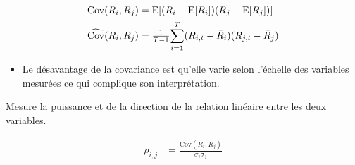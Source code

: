 \documentclass[10pt, french]{article}
\begin{document}
\begin{multicols*}{2}
\begin{definitionNOHFILL}[Covariance]
\begin{align*}
	\text{Cov}(R_{i}, R_{j})
	&=	\text{E}[(R_{i}	-	\text{E}[R_{i}])(R_{j}	-	\text{E}[R_{j}])]	\\
	\widehat{\text{Cov}}	(R_{i}, R_{j})
	&=	\tfrac{1}{T	-	1} \overset{T}{\underset{i	=	1}{\sum}} (R_{i, t}	-	\bar{R}_{i})(R_{j, t}	-	\bar{R}_{j})	\\
\end{align*}

\tcbline

\begin{itemize}
	\item	Le désavantage de la covariance est qu'elle varie selon l'échelle des variables mesurées ce qui complique son interprétation.
\end{itemize}
\end{definitionNOHFILL}

\begin{definitionNOHFILL}[Corrélation]
Mesure la puissance et de la direction de la relation linéaire entre les deux variables.

\begin{align*}
	\rho_{i, j}
	&=	\frac{\text{Cov}	(R_{i}, R_{j})}{\sigma_{i}\sigma_{j}}
\end{align*}

\begin{center}

\end{center}
\end{definitionNOHFILL}
\end{multicols*}
\end{document}
